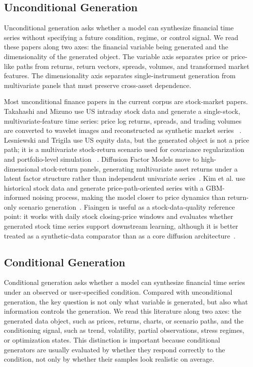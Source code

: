 \documentclass[sigconf,nonacm]{acmart}
\begin{document}
\subsection{Unconditional Generation}\label{sec:fts-uncond}

Unconditional generation asks whether a model can synthesize financial time
series without specifying a future condition, regime, or control signal. We read
these papers along two axes: the financial variable being generated and the
dimensionality of the generated object. The variable axis separates price or
price-like paths from returns, return vectors, spreads, volumes, and transformed
market features. The dimensionality axis separates single-instrument generation
from multivariate panels that must preserve cross-asset dependence. 

Most unconditional finance papers in the current corpus are stock-market papers.
Takahashi and Mizuno use US intraday stock data and generate a single-stock,
multivariate-feature time series: price log returns, spreads, and trading volumes
are converted to wavelet images and reconstructed as synthetic market series
~\cite{takahashi2024synthfts}. Lesniewski and Trigila use US equity data, but
the generated object is not a price path; it is a multivariate stock-return
scenario used for covariance regularization and portfolio-level simulation
~\cite{lesniewski2024beyondmc}. Diffusion Factor Models move to high-dimensional
stock-return panels, generating multivariate asset returns under a latent factor
structure rather than independent univariate series~\cite{chen2025difffactor}.
Kim et al. use historical stock data and generate price-path-oriented series with
a GBM-informed noising process, making the model closer to price dynamics than
return-only scenario generation~\cite{kim2025gbmdiff}. Fiaingen is useful as a
stock-data-quality reference point: it works with daily stock closing-price
windows and evaluates whether generated stock time series support downstream
learning, although it is better treated as a synthetic-data comparator than as a
core diffusion architecture~\cite{rozanec2025fiaingen}.

\subsection{Conditional Generation}\label{sec:fts-cond}
Conditional generation asks whether a model can synthesize financial time series
under an observed or user-specified condition. Compared with unconditional
generation, the key question is not only what variable is generated, but also
what information controls the generation. We read this literature along two
axes: the generated data object, such as prices, returns, charts, or scenario
paths, and the conditioning signal, such as trend, volatility, partial
observations, stress regimes, or optimization states. This distinction is
important because conditional generators are usually evaluated by whether they
respond correctly to the condition, not only by whether their samples look
realistic on average.
\end{document}
